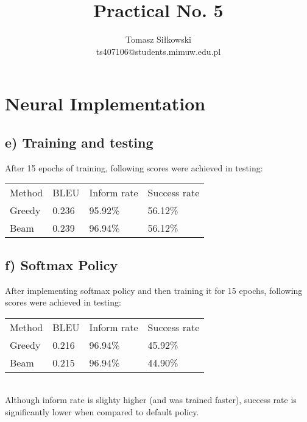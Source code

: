 \documentclass[12pt]{article}
\begin{document}
 
 
\title{Practical No. 5 }%
\author{Tomasz Siłkowski\\ %
ts407106@students.mimuw.edu.pl}
 
\maketitle

\setcounter{section}{1}
\section{Neural Implementation }
\subsection*{e) Training and testing}
After 15 epochs of training, following scores were achieved in testing:
\begin{table}[h]
\begin{tabular}{llll}
  Method & BLEU & Inform rate & Success rate \\
  Greedy & 0.236 & 95.92\% & 56.12\% \\
  Beam & 0.239 & 96.94\% & 56.12\% \\
\end{tabular}
\end{table}

\subsection*{f) Softmax Policy}
After implementing softmax policy and then training it for 15 epochs, following scores were achieved in testing:
\begin{table}[h]
  \begin{tabular}{llll}
  Method & BLEU & Inform rate & Success rate \\
  Greedy & 0.216 & 96.94\% & 45.92\% \\
  Beam & 0.215 & 96.94\% & 44.90\% \\
\end{tabular}
\end{table}
\\
Although inform rate is slighty higher (and was trained faster), success rate is significantly lower when compared to default policy.
\end{document}
